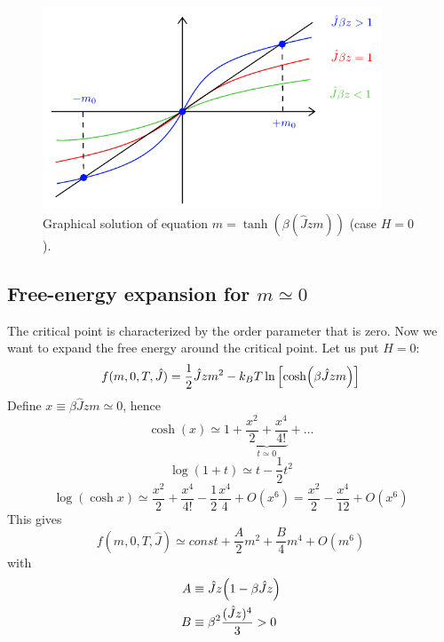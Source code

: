 \documentclass[../main/main.tex]{subfiles}
\begin{document}
\begin{figure}[h!]
\centering
\includegraphics[width=0.9\textwidth]{../lessons/11_image/1.pdf}
\caption{\label{fig:11_1} Graphical solution of equation \(m =  \tanh (\beta (\hat{J}z m )) \) (case \(H=0\)).}
\end{figure}


\subsection{Free-energy expansion for \( m \simeq 0 \)}
The critical point is characterized by the order parameter that is zero. Now we want to expand the free energy around the critical point. Let us put \( H=0 \):
\begin{equation}
  f(m,0,T,\hat{J} ) = \frac{1}{2}\hat{J}zm^2 -k_BT \ln{\qty[\cosh(\beta \hat{J}zm )]}
\end{equation}
Define \( x \equiv \beta \hat{J} z m \simeq 0  \), hence
\begin{equation}
  \cosh (x) \simeq 1 + \underbrace{\frac{x^2}{2} + \frac{x^4}{4!}}_{t \simeq 0}  + \dots
\end{equation}
\begin{equation}
  \log{(1+t)} \simeq t - \frac{1}{2}t^2
\end{equation}
\begin{equation}
  \log{(\cosh x)} \simeq \frac{x^2}{2} + \frac{x^4}{4!} - \frac{1}{2} \frac{x^4}{4}+O(x^6)
  = \frac{x^2}{2} - \frac{x^4}{12}+O(x^6)
\end{equation}
This gives
\begin{equation}
  f(m,0,T,\hat{J} ) \simeq  const + \frac{A}{2} m^2 + \frac{B}{4} m^4 + O (m^6)
\end{equation}
with
\begin{subequations}
\begin{align}
   A & \equiv  \hat{J} z \qty(1- \beta \hat{J} z) \\
    B & \equiv  \beta ^2 \frac{(\hat{J}z )^4}{3} > 0
\end{align}
\end{subequations}
\end{document}
